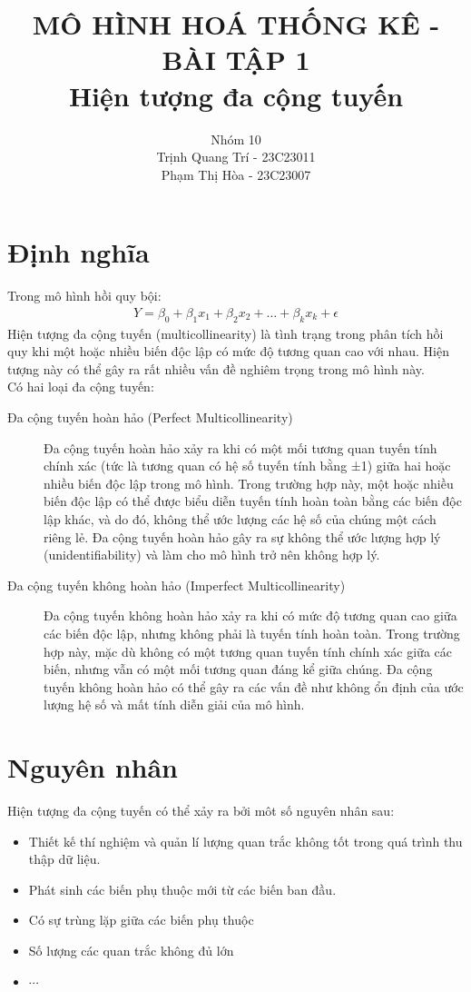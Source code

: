 \documentclass[12pt,a4papers]{article}
\title{
MÔ HÌNH HOÁ THỐNG KÊ - BÀI TẬP 1 \\
Hiện tượng đa cộng tuyến
}
\author{
Nhóm 10\\
Trịnh Quang Trí - 23C23011\\
Phạm Thị Hòa - 23C23007
}
\date{}
\begin{document}
\maketitle

\section{Định nghĩa}
Trong mô hình hồi quy bội:
\begin{align}
    \textit{Y} = \beta_0 + \beta_1\textit{x}_1 + \beta_2\textit{x}_2 + \hdots + \beta_k\textit{x}_k + \epsilon   \label{model}
\end{align}
Hiện tượng đa cộng tuyến (multicollinearity) là tình trạng trong phân tích hồi quy khi một hoặc nhiều biến độc lập có mức độ tương quan cao với nhau. Hiện tượng này có thể gây ra rất nhiều vấn đề nghiêm trọng trong mô hình này. \\
Có hai loại đa cộng tuyến:
\begin{description}
    \item[Đa cộng tuyến hoàn hảo (Perfect Multicollinearity)]
    Đa cộng tuyến hoàn hảo xảy ra khi có một mối tương quan tuyến tính chính xác (tức là tương quan có hệ số tuyến tính bằng ±1) giữa hai hoặc nhiều biến độc lập trong mô hình.
    Trong trường hợp này, một hoặc nhiều biến độc lập có thể được biểu diễn tuyến tính hoàn toàn bằng các biến độc lập khác, và do đó, không thể ước lượng các hệ số của chúng một cách riêng lẻ.
    Đa cộng tuyến hoàn hảo gây ra sự không thể ước lượng hợp lý (unidentifiability) và làm cho mô hình trở nên không hợp lý.
    \item[Đa cộng tuyến không hoàn hảo (Imperfect Multicollinearity)] Đa cộng tuyến không hoàn hảo xảy ra khi có mức độ tương quan cao giữa các biến độc lập, nhưng không phải là tuyến tính hoàn toàn.
    Trong trường hợp này, mặc dù không có một tương quan tuyến tính chính xác giữa các biến, nhưng vẫn có một mối tương quan đáng kể giữa chúng.
    Đa cộng tuyến không hoàn hảo có thể gây ra các vấn đề như không ổn định của ước lượng hệ số và mất tính diễn giải của mô hình.
\end{description}
\section{Nguyên nhân}

Hiện tượng đa cộng tuyến có thể xảy ra bởi môt số nguyên nhân sau:
\begin{itemize}
    \item Thiết kế thí nghiệm và quản lí lượng quan trắc không tốt trong quá trình thu thập dữ liệu.
    \item Phát sinh các biến phụ thuộc mới từ các biến ban đầu.
    \item Có sự trùng lặp giữa các biến phụ thuộc
    \item Số lượng các quan trắc không đủ lớn
    \item $\cdots$
\end{itemize}
\end{document}
